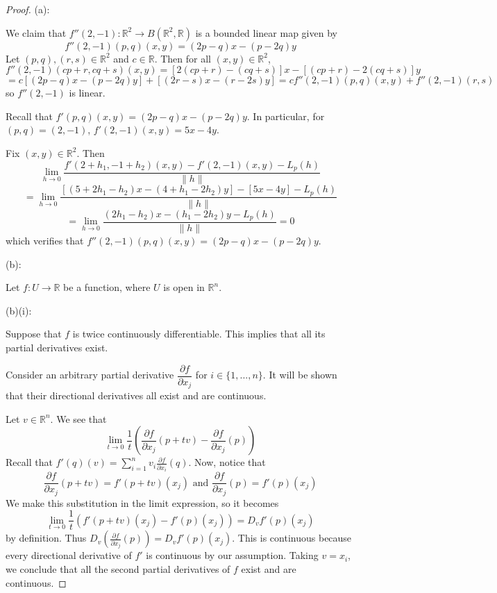 \documentclass{article}
\theoremstyle{plain} %
\numberwithin{thm}{section} %
\theoremstyle{definition}
\begin{document}
        \begin{proof}
            (a):

            We claim that \(f''(2,-1) : \mathbb{R}^2 \to B(\mathbb{R}^2,\mathbb{R})\) is a bounded linear map given by
            \[
                f''(2,-1)(p,q)(x,y) = (2p - q)x - (p - 2q)y
            \]
            Let \((p,q), (r,s) \in \mathbb{R}^2\) and \(c \in \mathbb{R}\). Then for all \((x,y) \in \mathbb{R}^2\),
            \[
                f''(2,-1)(cp + r, cq + s)(x,y) = [2(cp + r) - (cq + s)]x - [(cp + r) - 2(cq + s)]y
            \]
            \[
                = c[(2p - q)x - (p - 2q)y] + [(2r - s)x - (r - 2s)y] = cf''(2,-1)(p,q)(x,y) + f''(2,-1)(r,s)
            \]
            so \(f''(2,-1)\) is linear.

            Recall that \(f'(p,q)(x,y) = (2p - q)x - (p - 2q)y\). In particular, for \((p,q) = (2,-1)\), \(f'(2,-1)(x,y) = 5x - 4y\).
            
            Fix \((x,y) \in \mathbb{R}^2\). Then
            \[
                \lim_{h \to 0} \frac{f'(2 + h_1, -1 + h_2)(x,y) - f'(2,-1)(x,y) - L_p(h)}{\|h\|}
            \]
            \[
                = \lim_{h \to 0} \frac{[(5 + 2h_1 - h_2)x - (4 + h_1 - 2h_2)y] - [5x - 4y] - L_p(h)}{\|h\|}
            \]
            \[
                = \lim_{h \to 0} \frac{(2h_1 - h_2)x - (h_1 - 2h_2)y - L_p(h)}{\|h\|} = 0
            \]
            which verifies that \(f''(2,-1)(p,q)(x,y) = (2p - q)x - (p - 2q)y\).

            (b):

            Let \(f : U \to \mathbb{R}\) be a function, where \(U\) is open in \(\mathbb{R}^n\).

            (b)(i):

            Suppose that \(f\) is twice continuously differentiable. This implies that all its partial derivatives exist.

            Consider an arbitrary partial derivative \(\dfrac{\partial f}{\partial x_j}\) for \(i \in \{1, ..., n\}\). It will be shown that their directional derivatives all exist and are continuous.

            Let \(v \in \mathbb{R}^n\). We see that
            \[
                \lim_{t \to 0} \frac{1}{t}\left( \frac{\partial f}{\partial x_j} (p+tv) - \frac{\partial f}{\partial x_j} (p) \right) 
            \]
            Recall that \(f'(q)(v) = \sum_{i=1} ^n v_i \frac{\partial f}{\partial x_i} (q)\). Now, notice that
            \[
                \frac{\partial f}{\partial x_j} (p+tv) = f'(p+tv)(x_j) \text{ and } \frac{\partial f}{\partial x_j} (p) = f'(p)(x_j)
            \]
            We make this substitution in the limit expression, so it becomes
            \[
                \lim_{t \to 0} \frac{1}{t}(f'(p+tv)(x_j) - f'(p)(x_j)) = D_v f'(p)(x_j)
            \]
            by definition. Thus \(D_v \left( \frac{\partial f}{\partial x_j} (p)\right) = D_v f'(p)(x_j)\). This is continuous because every directional derivative of \(f'\) is continuous by our assumption. Taking \(v = x_i\), we conclude that all the second partial derivatives of \(f\) exist and are continuous.
            

\end{proof}
\end{document}
